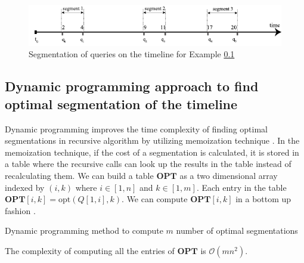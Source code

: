 \begin{figure}
	\centering
	\includegraphics[width=\textwidth]{figs/example_recursive_s.pdf}
	\caption{Segmentation of queries on the timeline for Example \ref{}}
	\label{fig:example_recursive_segmentation}
\end{figure}


\subsection{Dynamic programming approach to find optimal segmentation of the timeline}

Dynamic programming improves the time complexity of finding optimal segmentations in recursive algorithm by utilizing memoization technique \cite{johnsonbaugh2003algorithms}. In the memoization technique, if the cost of a segmentation is calculated, it is stored in a table where the recursive calls can look up the results in the table instead of recalculating them. We can build a table $\mathbf{OPT}$ as a two dimensional array
indexed by $(i, k)$ where $i\in [1, n]$ and $k\in [1, m]$.  Each entry
in the table $\mathbf{OPT}[i,k] = \mathrm{opt}(Q[1,i], k)$.
We can compute $\mathbf{OPT}[i,k]$ in a bottom up fashion \cite{kossmann2000iterative}.

\begin{algorithm}[H]
\SetAlgoLined
\caption{Dynamic programming method to compute $m$ number of optimal segmentations}
\label{alg:dynamic_programming}
\DontPrintSemicolon
 
\end{algorithm}

The complexity of computing all the entries of $\mathbf{OPT}$ is $\mathcal{O}(mn^2)$.


